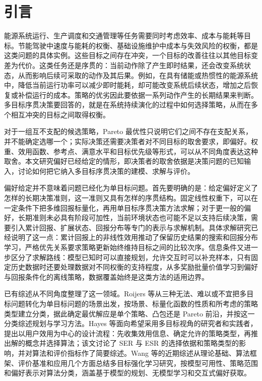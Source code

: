 \section{引言}\label{sec:intro}

能源系统运行、生产调度和交通管理等任务需要同时考虑效率、成本与能耗等目标。节能驾驶中速度与能耗的权衡、基础设施维护中成本与失效风险的权衡，都是这类问题的具体实例\cite{he2023,remmerden2025}。这些目标之间存在冲突，一个目标的改善往往以其他目标变差为代价。这类任务还是序贯的：当前动作除了产生即时结果，还会改变系统状态，从而影响后续可采取的动作及其后果。例如，在具有储能或热惯性的能源系统中，降低当前运行功率可以减少即时能耗，却可能改变系统后续状态，增加之后恢复或补偿运行的成本。策略的优劣因此要依据一系列动作产生的长期结果来判断。多目标序贯决策要回答的，就是在系统持续演化的过程中如何选择策略，从而在多个相互冲突的目标之间取得权衡。

对于一组互不支配的候选策略，Pareto 最优性只说明它们之间不存在支配关系，并不能确定选哪一个；实际决策还需要决策者对不同目标的取舍要求，即偏好。权重、效用函数、参考点、满意水平和目标优先级等形式，可以从不同角度表达这种取舍\cite{wang2017}。本文研究偏好已经给定的情形，即决策者的取舍依据是决策问题的已知输入，讨论如何把它纳入多目标序贯决策的建模、求解与评价。

偏好给定并不意味着问题已经化为单目标问题。首先要明确的是：给定偏好定义了怎样的长期决策准则，这一准则又具有怎样的序贯结构。固定线性权重下，可以在一定条件下把多维回报标量化，再用单目标序贯决策方法求解；对于更一般的偏好，长期准则未必具有阶段可加性，当前环境状态也可能不足以支持后续决策，需要引入累计回报、扩展状态、回报分布等专门的表示与求解机制。具体求解研究已经说明了这一点：累计回报上的非线性效用推动了保留历史结果的搜索和回报分布学习\cite{hayes2023,reymond2023}，严格优先关系要求策略更新始终维持目标之间的比较次序\cite{skalse2022}。信息条件又进一步区分了求解路线：模型已知时可以直接规划，允许交互时可以补充样本，只有固定历史数据时还要处理数据对不同权衡的支持程度，从多奖励批量价值学习\cite{lizotte2012}到偏好与回报条件化的离线策略\cite{zhu2023}，数据覆盖始终是这类方法的适用边界。

已有综述从不同角度整理了这一领域。Roijers 等从三种无法、难以或不宜把多目标问题转化为单目标问题的场景出发，按场景、标量化函数的性质和所考虑的策略类型建立分类，据此确定最优解应是单个策略、凸包还是 Pareto 前沿，并按这一分类综述规划与学习方法\cite{roijers2013}。Hayes 等面向希望采用多目标视角的研究者和实践者，提出以用户效用为中心的设计流程：先收集效用信息、确定允许的策略类型，再推出解的概念并选择算法；该文讨论了 SER 与 ESR 的选择依据和策略类型的影响，并对算法和评价指标作了简要综述\cite{hayes2022}。Wang 等的近期综述从理论基础、算法框架、评价基准和应用几个方面总结多目标强化学习研究，按模型可用性、策略范围和偏好表示对算法分类，涵盖基于模型的规划、无模型学习和交互式偏好获取\cite{wang2026}。


